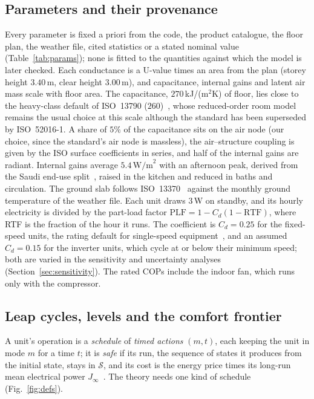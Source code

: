 \documentclass[10pt,a4paper,twocolumn]{article}
\theoremstyle{definition}
\begin{document}
\subsection{Parameters and their provenance}\label{sec:params}
Every parameter is fixed a priori from the code, the product catalogue, the floor plan, the weather file, cited statistics or a stated nominal value (Table~\ref{tab:params}); none is fitted to the quantities against which the model is later checked. Each conductance is a U-value times an area from the plan (storey height $3.40\,$m, clear height $3.00\,$m), and capacitance, internal gains and latent air mass scale with floor area. The capacitance, $270\,$kJ/(m$^2$K) of floor, lies close to the heavy-class default of ISO~13790 ($260$)~\citep{iso13790_2008}, whose reduced-order room model remains the usual choice at this scale although the standard has been superseded by ISO~52016-1. A share of $5\%$ of the capacitance sits on the air node (our choice, since the standard's air node is massless), the air--structure coupling is given by the ISO surface coefficients in series, and half of the internal gains are radiant. Internal gains average $5.4\,\text{W/m}^2$ with an afternoon peak, derived from the Saudi end-use split~\citep{stockmodel2020}, raised in the kitchen and reduced in baths and circulation. The ground slab follows ISO~13370~\citep{iso13370_2017} against the monthly ground temperature of the weather file. Each unit draws $3\,$W on standby, and its hourly electricity is divided by the part-load factor $\mathrm{PLF}=1-C_d(1-\mathrm{RTF})$, where RTF is the fraction of the hour it runs. The coefficient is $C_d=0.25$ for the fixed-speed units, the rating default for single-speed equipment~\citep{ahri210240}, and an assumed $C_d=0.15$ for the inverter units, which cycle at or below their minimum speed; both are varied in the sensitivity and uncertainty analyses (Section~\ref{sec:sensitivity}). The rated COPs include the indoor fan, which runs only with the compressor.

\subsection{Leap cycles, levels and the comfort frontier}\label{sec:runex}
A unit's operation is a \emph{schedule} of \emph{timed actions} $(m,t)$, each keeping the unit in mode $m$ for a time $t$; it is \emph{safe} if its run, the sequence of states it produces from the initial state, stays in $\mathcal{S}$, and its cost is the energy price times its long-run mean electrical power $J_\infty$~\citep{mousa2016optimal,mousa2017optimal,alur2012optimal}. The theory needs one kind of schedule (Fig.~\ref{fig:defs}).
\end{document}
